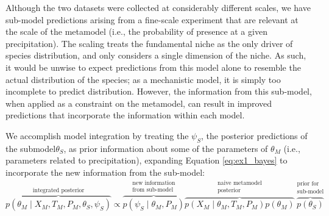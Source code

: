\documentclass[11pt]{article}
\begin{document}
Although the two datasets were collected at considerably different scales, we have sub-model predictions arising from a fine-scale experiment that are relevant at the scale of the metamodel (i.e., the probability of presence at a given precipitation). 
The scaling treats the fundamental niche as the only driver of species distribution, and only considers a single dimension of the niche.
As such, it would be unwise to expect predictions from this model alone to resemble the actual distribution of the species; as a mechanistic model, it is simply too incomplete to predict distribution.
However, the information from this sub-model, when applied as a constraint on the metamodel, can result in improved predictions that incorporate the information within each model.

We accomplish model integration by treating the \(\psi_S\), the posterior predictions of the submodel\(\theta_S\), as prior information about some of the parameters of \(\theta_M\) (i.e., parameters related to precipitation), expanding Equation \ref{eq:ex1_bayes} to incorporate the new information from the sub-model:
\begin{equation}
	\label{eq:ex1_integrated}
	\overbrace{p(\theta_M \mid X_M, T_M, P_M, \theta_S, \psi_S)}^\text{integrated posterior}
	\propto
	\overbrace{p\left (\psi_S \mid \theta_M,P_M \right )}^{\substack{\text{new information} \\ \text{from sub-model}}}
	\overbrace{p \left(X_M \mid \theta_M, T_M, P_M \right) p \left(\theta_M \right)}^{\substack{\text{naive metamodel} \\ \text{posterior}}}
	\overbrace{p \left(\theta_S \right)}^{\substack{\text{prior for} \\ \text{sub-model}}}	
\end{equation}
\end{document}
